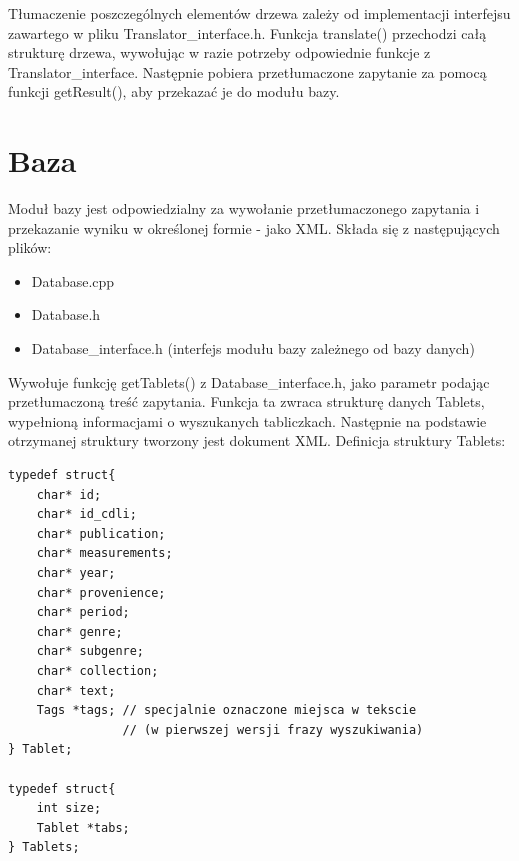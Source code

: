 Tłumaczenie poszczególnych elementów drzewa zależy od implementacji interfejsu zawartego w pliku Translator\_interface.h. 
Funkcja translate() przechodzi całą strukturę drzewa, wywołując w razie potrzeby odpowiednie funkcje z Translator\_interface.
Następnie pobiera przetłumaczone zapytanie za pomocą funkcji getResult(), aby przekazać je do modułu bazy.

\section{Baza}
Moduł bazy jest odpowiedzialny za wywołanie przetłumaczonego zapytania i przekazanie wyniku w określonej formie - jako XML.
Składa się z następujących plików:
\begin {itemize}
 \item Database.cpp
 \item Database.h
 \item Database\_interface.h (interfejs modułu bazy zależnego od bazy danych)
\end {itemize}

Wywołuje funkcję getTablets() z Database\_interface.h, jako parametr podając przetłumaczoną treść zapytania. 
Funkcja ta zwraca strukturę danych Tablets, wypełnioną informacjami o wyszukanych tabliczkach.
Następnie na podstawie otrzymanej struktury tworzony jest dokument XML.
\newline
Definicja struktury Tablets:
\begin{verbatim}
typedef struct{    
    char* id;
    char* id_cdli;
    char* publication;
    char* measurements;
    char* year;
    char* provenience;
    char* period;
    char* genre;
    char* subgenre;
    char* collection;
    char* text;
    Tags *tags; // specjalnie oznaczone miejsca w tekscie
                // (w pierwszej wersji frazy wyszukiwania)
} Tablet;

typedef struct{
    int size;
    Tablet *tabs;
} Tablets;
\end{verbatim}



